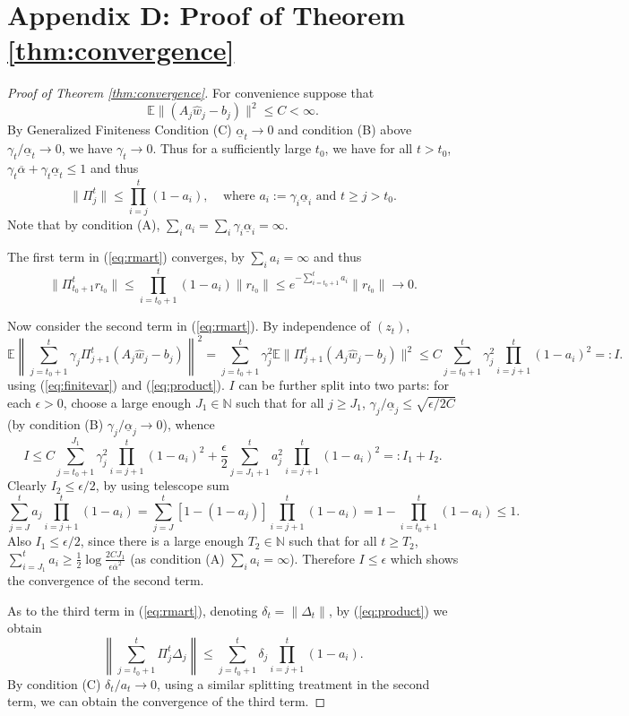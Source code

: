 \documentclass[twoside,11pt]{amsart}
\theoremstyle{theorem}
\theoremstyle{definition}
\theoremstyle{remark}
\newcommand{\DS}{\displaystyle}
\def\E{{\mathbb E}}        %
\def\w{\hat{w}}
\def\N{{\mathbb N}}
\def\amax{{\overline{\alpha}}}
\def\amin{{\underline{\alpha}} }
\def\t{t_0}
\def\De{\Delta}
\def\de{\delta}
\def\ga{\gamma}
\def\eps{\epsilon}
\begin{document}
\section*{Appendix D: Proof of Theorem \ref{thm:convergence}} 
\renewcommand{\thesection}{D}
\setcounter{equation}{0} \setcounter{thm}{0}
\renewcommand{\thethm}{D.\arabic{thm}}
\renewcommand{\theequation}{D-\arabic{equation}}

\begin{proof}[Proof of Theorem \ref{thm:convergence}]
For convenience suppose that 
\begin{equation} \label{eq:finitevar}
\E \|(A_j \w_j - b_j)\|^2\leq C<\infty. 
\end{equation}
By Generalized Finiteness Condition (C) $\amin_t\to 0$ and condition (B) above $\ga_t/\amin_t\to 0$, we have $\ga_t\to 0$. 
Thus for a sufficiently large $\t$, we have for all $t> \t$, $\ga_t\amax + \ga_t \amin_t\leq 1$ and thus
\begin{equation} \label{eq:product}
\|\Pi_j^t\| \leq \prod_{i=j}^t (1 - a_i), \ \ \ \ \ \mbox{where $a_i:=\ga_i \amin_i$ and $t\geq j > \t$}. 
\end{equation}
Note that by condition (A), $\sum_i a_i = \sum_i \ga_i \amin_i =\infty$. 

The first term in (\ref{eq:rmart}) converges, by $\sum_i a_i=\infty$ and thus
\[ \|\Pi_{t_0+1}^t r_{t_0} \|\leq \prod_{i=t_0+1}^t (1 - a_i) \|r_{t_0}\|\leq e^{-\sum_{i=t_0+1}^t a_i}\| r_{t_0}\| \to 0. \]

Now consider the second term in (\ref{eq:rmart}). By independence of $(z_t)$, 
\[ 
\E \left\| \sum_{j=t_0+1}^t \gamma_j \Pi_{j+1}^t (A_j \w_j - b_j) \right \|^2 = \sum_{j=t_0+1}^t \ga_j^2 \E\|\Pi_{j+1}^t (A_j \w_j - b_j)\|^2 \leq 
C \sum_{j=t_0+1}^t \ga_j^2 \prod_{i=j+1}^t (1 - a_i)^2=:I.
\]
using (\ref{eq:finitevar}) and (\ref{eq:product}). 
$I$ can be further split into two parts: for each $\eps>0$, choose a large enough $J_1\in \N$ 
such that for all $j\geq J_1$, $\ga_j/\amin_j \leq \sqrt{\epsilon/2C}$ (by condition (B) $\ga_j/\amin_j \to 0$), whence
\[ I \leq C \sum_{j=t_0+1}^{J_1} \ga_j^2 \prod_{i=j+1}^t(1 - a_i)^2 + 
\frac{\epsilon}{2} \sum_{j=J_1+1}^t a_j^2 \prod_{i=j+1}^t(1 - a_i)^2 =: I_1+I_2.\]
Clearly $I_2 \leq \epsilon/2$, by using telescope sum
\begin{equation} \label{eq:telescope}
 \sum_{j=J}^t a_j \prod_{i=j+1}^t(1 - a_i)
=\sum_{j=J}^t [1-(1-a_j)]\prod_{i=j+1}^t(1 - a_i)= 1 - \prod_{i=t_0+1}^t(1-a_i) \leq 1.
\end{equation}
Also $\DS I_1\leq \epsilon/2$, since there is a large enough $T_2\in \N$ such that for all $t\geq T_2$, 
$\DS \sum_{i=J_1}^t a_i \geq \frac{1}{2} \log \frac{2 C J_1}{\epsilon\amax^2}$
(as condition (A) $\sum_i a_i =\infty$). 
Therefore $I\leq \eps$ which shows the convergence of the second term.  
 

As to the third term in (\ref{eq:rmart}), denoting $\de_t = \|\De_t\|$, by (\ref{eq:product}) we obtain
\[\left \| \sum_{j=t_0+1}^t \Pi_{j}^t \Delta_j \right \| \leq  \sum_{j=t_0+1}^t \de_j  \prod_{i=j+1}^t (1 - a_i). \]
By condition (C) $\de_t/a_t \to 0$, using a similar splitting treatment in the second term, we can obtain the convergence of the third
term.
\end{proof}
\end{document}
